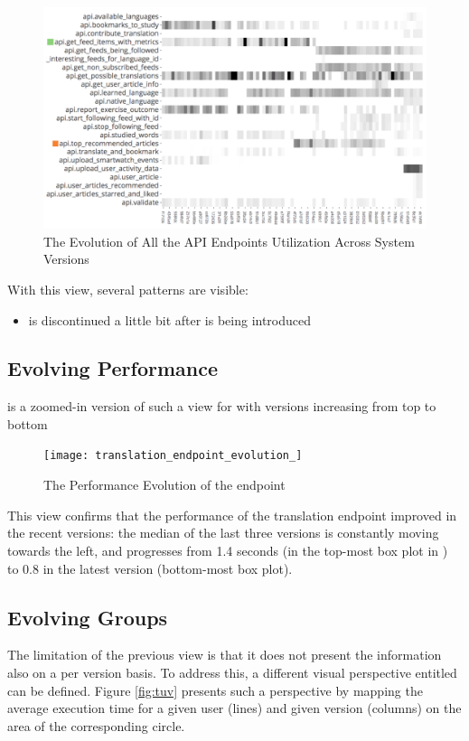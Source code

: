     \begin{figure}[h!]
      \centering
      \includegraphics[width=0.9\linewidth]{utilization-evolution}
      \caption{The Evolution of All the API Endpoints Utilization Across System Versions}
      \label{fig:mv-util}
    \end{figure}

  With this view, several patterns are visible:
  \begin{itemize}
    
    \item \epFeedItems is discontinued a little bit after \epTopArticles is being introduced

  \end{itemize}


  \subsection*{Evolving Performance}

     is a zoomed-in version of such a view for \epTranslations with versions increasing from top to bottom

    \begin{figure}[h!]
      \centering
      \texttt{[image: translation\_endpoint\_evolution\_]}
      \caption{The Performance Evolution of the \epTranslations endpoint}
      \label{fig:tee}
    \end{figure}


  This view confirms that the performance of the translation endpoint improved in the recent versions: the median of the last three versions is constantly moving towards the left, and progresses from 1.4 seconds (in the top-most box plot in ) to 0.8 in the latest version (bottom-most box plot).


\subsection*{Evolving Groups}
  The limitation of the previous view is that it does not present the information also on a per version basis. To address this, a different visual perspective entitled  can be defined. Figure \ref{fig:tuv} presents such a perspective by mapping the average execution time for a given user (lines) and given version (columns) on the area of the corresponding circle. 

